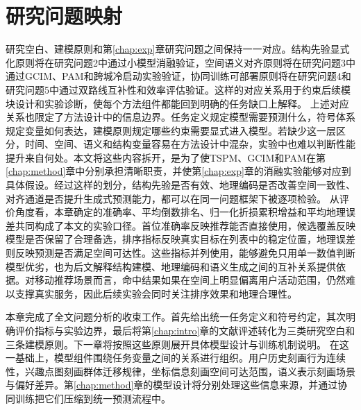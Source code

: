 \section{研究问题映射}
研究空白、建模原则和第\ref{chap:exp}章研究问题之间保持一一对应。结构先验显式化原则将在研究问题2中通过小模型消融验证，空间语义对齐原则将在研究问题3中通过GCIM、PAM和跨城冷启动实验验证，协同训练可部署原则将在研究问题4和研究问题5中通过双路线互补性和效率评估验证。这样的对应关系用于约束后续模块设计和实验诊断，使每个方法组件都能回到明确的任务缺口上解释。
上述对应关系也限定了方法设计中的信息边界。任务定义规定模型需要预测什么，符号体系规定变量如何表达，建模原则规定哪些约束需要显式进入模型。若缺少这一层区分，时间、空间、语义和结构变量容易在方法设计中混杂，实验中也难以判断性能提升来自何处。本文将这些内容拆开，是为了使TSPM、GCIM和PAM在第\ref{chap:method}章中分别承担清晰职责，并使第\ref{chap:exp}章的消融实验能够对应到具体假设。经过这样的划分，结构先验是否有效、地理编码是否改善空间一致性、对齐通道是否提升生成式预测能力，都可以在同一问题框架下被逐项检验。
从评价角度看，本章确定的准确率、平均倒数排名、归一化折损累积增益和平均地理误差共同构成了本文的实验口径。首位准确率反映推荐能否直接使用，候选覆盖反映模型是否保留了合理备选，排序指标反映真实目标在列表中的稳定位置，地理误差则反映预测是否满足空间可达性。这些指标并列使用，能够避免只用单一数值判断模型优劣，也为后文解释结构建模、地理编码和语义生成之间的互补关系提供依据。对移动推荐场景而言，命中结果如果在空间上明显偏离用户活动范围，仍然难以支撑真实服务，因此后续实验会同时关注排序效果和地理合理性。

本章完成了全文问题分析的收束工作。首先给出统一任务定义和符号约定，其次明确评价指标与实验边界，最后将第\ref{chap:intro}章的文献评述转化为三类研究空白和三条建模原则。下一章将按照这些原则展开具体模型设计与训练机制说明。
在这一基础上，模型组件围绕任务变量之间的关系进行组织。用户历史刻画行为连续性，兴趣点图刻画群体迁移规律，坐标信息刻画空间可达范围，语义表示刻画场景与偏好差异。第\ref{chap:method}章的模型设计将分别处理这些信息来源，并通过协同训练把它们压缩到统一预测流程中。
